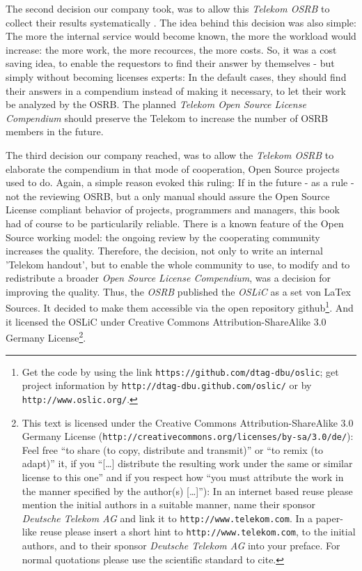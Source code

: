The second decision our company took, was to allow this \emph{Telekom OSRB} to
collect their results systematically . The idea behind this decision was also
simple: The more the internal service would become known, the more the workload
would increase: the more work, the more recources, the more costs. So, it was a
cost saving idea, to enable the requestors to find their answer by themselves -
but simply without becoming licenses experts: In the default cases, they should
find their answers in a compendium instead of making it necessary, to let their
work be analyzed by the OSRB. The planned \emph{Telekom Open Source License
Compendium} should preserve the Telekom to increase the number of OSRB members in
the future.

The third decision our company reached, was to allow the \emph{Telekom OSRB} to
elaborate the compendium in that mode of cooperation, Open Source projects used
to do. Again, a simple reason evoked this ruling: If in the future - as a rule -
not the reviewing OSRB, but a only manual should assure the Open Source License
compliant behavior of projects, programmers and managers, this book had of
course to be particularily reliable. There is a known feature of the Open Source
working model: the ongoing review by the cooperating community increases the
quality. Therefore, the decision, not only to write an internal 'Telekom
handout', but to enable the whole community to use, to modify and to
redistribute a broader \emph{Open Source License Compendium}, was a decision for
improving the quality. Thus, the \emph{OSRB} published the \emph{OSLiC} as a set
von LaTex Sources. It decided to make them accessible via the open repository
github\footnote{Get the code by using the link
\texttt{https://github.com/dtag-dbu/oslic}; get project information by
\texttt{http://dtag-dbu.github.com/oslic/} or by
\texttt{http://www.oslic.org/}.}. And it licensed the OSLiC under Creative
Commons Attribution-ShareAlike 3.0 Germany License\footnote{ This text is
licensed under the Creative Commons Attribution-ShareAlike 3.0 Germany License
(\texttt{http://creativecommons.org/licenses/by-sa/3.0/de/}): Feel free
\enquote{to share (to copy, distribute and transmit)} or \enquote{to remix (to
adapt)} it, if you \enquote{[\ldots] distribute the resulting work under the
same or similar license to this one} and if you respect how \enquote{you must
attribute the work in the manner specified by the author(s) [\ldots]}):
In an internet based reuse please mention the initial authors in a suitable
manner, name their sponsor \textit{Deutsche Telekom AG} and link it to
\texttt{http://www.telekom.com}. In a paper-like reuse please insert a short
hint to \texttt{http://www.telekom.com}, to the initial authors, and to their
sponsor \textit{Deutsche Telekom AG} into your preface. For normal quotations
please use the scientific standard to cite.}.

